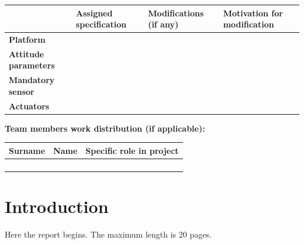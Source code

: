 \documentclass[a4paper,12pt]{article}
\begin{document}
\begin{titlepage}
    \begin{tabularx}{\textwidth}{|l|X|X|X|}
        \hline
        & \textbf{Assigned specification} & \textbf{Modifications (if any)} & \textbf{Motivation for modification} \\
        \hline
        \textbf{Platform} & & & \\ \hline
        \textbf{Attitude parameters} & & & \\ \hline
        \textbf{Mandatory sensor} & & & \\ \hline
        \textbf{Actuators} & & & \\ \hline
    \end{tabularx}

    \vspace{1cm}

    \begin{flushleft}
        \textbf{Team members work distribution (if applicable):}
    \end{flushleft}

    \begin{tabularx}{\textwidth}{|X|X|X|}
        \hline
        \textbf{Surname} & \textbf{Name} & \textbf{Specific role in project} \\
        \hline
        & & \\ \hline
        & & \\ \hline
        & & \\ \hline
        & & \\ \hline
    \end{tabularx}

    \vfill
\end{titlepage}

\setcounter{page}{2}

\tableofcontents
\newpage


\section{Introduction}
Here the report begins. The maximum length is 20 pages.
\end{document}
